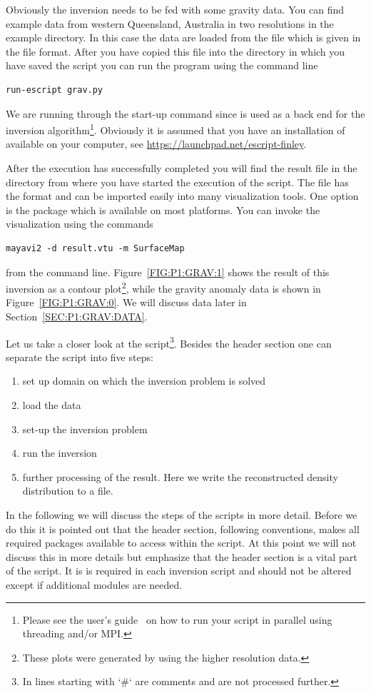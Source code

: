 Obviously the inversion needs to be fed with some gravity data. You can find
example data from western Queensland, Australia in two resolutions in the
\escript example directory. In this case the data are loaded from the file
 which is given in the \netcdf file format.
After you have copied this file into the directory in which you have saved the
script  you can run the program using the command line 
\begin{verbatim}
run-escript grav.py
\end{verbatim}
We are running  through the \escript start-up command since
\escript is used as a back end for the inversion algorithm\footnote{Please see
the \escript user's guide~\cite{ESCRIPT} on how to run your script in parallel
using threading and/or MPI.}.
Obviously it is assumed that you have an installation of \escript available on
your computer, see \url{https://launchpad.net/escript-finley}.

After the execution has successfully completed you will find the result file
 in the directory from where you have started the execution
of the script.
The file has the \VTK format and can be imported easily into many
visualization tools.
One option is the \mayavi package which is available on most platforms.
You can invoke the visualization using the commands
\begin{verbatim}
mayavi2 -d result.vtu -m SurfaceMap
\end{verbatim}
from the command line.
Figure~\ref{FIG:P1:GRAV:1} shows the result of this inversion as a contour
plot\footnote{These plots were generated by \VisIt using the higher resolution
data.}, while the gravity anomaly data is shown in Figure~\ref{FIG:P1:GRAV:0}.
We will discuss data later in Section~\ref{SEC:P1:GRAV:DATA}.

Let us take a closer look at the script\footnote{In \Python lines starting
with `\#` are comments and are not processed further.}. Besides the header
section one can separate the script into five steps:
\begin{enumerate}
    \item set up domain on which the inversion problem is solved
    \item load the data 
    \item set-up the inversion problem
    \item run the inversion
    \item further processing of the result. Here we write the reconstructed
          density distribution to a file.
\end{enumerate}
In the following we will discuss the steps of the scripts in more detail.
Before we do this it is pointed out that the header section, following
\Python conventions, makes all required packages available to access within
the script.
At this point we will not discuss this in more details but emphasize that the
header section is a vital part of the script.
It is is required in each \downunder inversion script and should not be
altered except if additional modules are needed.

